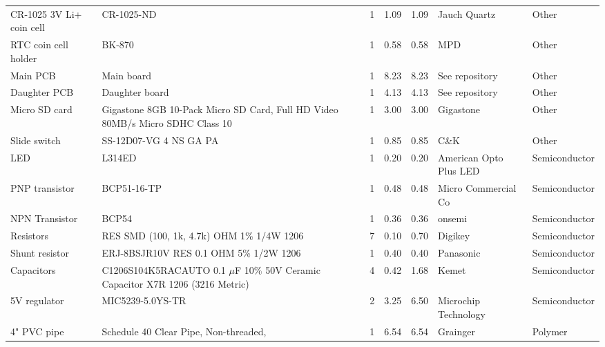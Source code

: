 \documentclass[11pt,letterpaper]{article}
\begin{document}
\begin{longtable}{ p{1.75cm} p{4cm} p{1.25cm} p{1cm} p{1cm} p{2cm} p{2.5cm} }
	\rowcolor[gray]{0.925}
	CR-1025 3V Li+ coin cell & CR-1025-ND & 1 & 1.09 & 1.09 & Jauch Quartz & Other \\
	
	RTC coin cell holder & BK-870 & 1 & 0.58 & 0.58 & MPD & Other \\
	
	\rowcolor[gray]{0.925}
	Main PCB & Main board & 1 & 8.23 & 8.23 & See repository & Other \\
	
	Daughter PCB & Daughter board & 1 & 4.13 & 4.13 & See repository & Other \\
	
	\rowcolor[gray]{0.925}
	Micro SD card & Gigastone 8GB 10-Pack Micro SD Card, Full HD Video 80MB/s Micro SDHC Class 10 & 1 & 3.00 & 3.00 & Gigastone & Other \\
	
	
	Slide switch & SS-12D07-VG 4 NS GA PA & 1 & 0.85 & 0.85 & C\&K & Other \\
	
	\rowcolor[gray]{0.925}
	LED & L314ED & 1 & 0.20 & 0.20 & American Opto Plus LED & Semiconductor \\
	
	
	PNP transistor & BCP51-16-TP & 1 & 0.48 & 0.48 & Micro Commercial Co & Semiconductor \\
	
	\rowcolor[gray]{0.925}
	NPN Transistor & BCP54 & 1 & 0.36 & 0.36 & onsemi & Semiconductor \\
	
	
	Resistors & RES SMD (100, 1k, 4.7k) OHM 1\% 1/4W 1206 & 7 & 0.10 & 0.70 & Digikey & Semiconductor \\
	
	\rowcolor[gray]{0.925}
	Shunt resistor & ERJ-8BSJR10V RES 0.1 OHM 5\% 1/2W 1206 & 1 & 0.40 & 0.40 & Panasonic & Semiconductor \\
	
	
	Capacitors & C1206S104K5RACAUTO 0.1 $\mu$F 10\% 50V Ceramic Capacitor X7R 1206 (3216 Metric) & 4 & 0.42 & 1.68 & Kemet & Semiconductor \\
	
	\rowcolor[gray]{0.925}
	5V regulator & MIC5239-5.0YS-TR & 2 & 3.25 & 6.50 & Microchip Technology & Semiconductor \\  
	
	
	4" PVC pipe & Schedule 40 Clear Pipe, Non-threaded,  & 1 & 6.54 & 6.54 & Grainger & Polymer \\  


\end{longtable}
\end{document}
